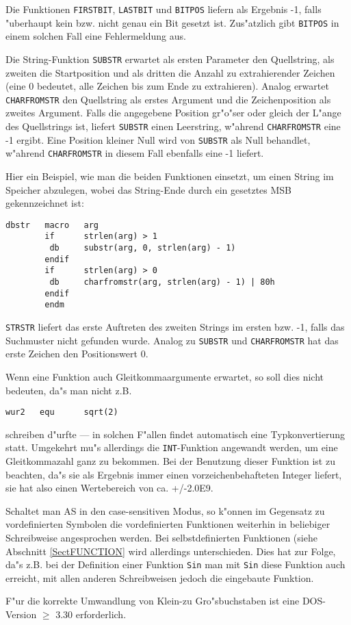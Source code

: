 \documentclass[12pt,a4paper,twoside]{report}
\newcommand{\tty}[1]{{\tt #1}}
\begin{document}
Die Funktionen \tty{FIRSTBIT}, \tty{LASTBIT} und \tty{BITPOS} liefern
als Ergebnis -1, falls "uberhaupt kein bzw. nicht genau ein Bit gesetzt
ist. Zus"atzlich gibt \tty{BITPOS} in einem solchen Fall eine
Fehlermeldung aus.
\par
Die String-Funktion \tty{SUBSTR} erwartet als ersten Parameter den
Quellstring, als zweiten die Startposition und als dritten die Anzahl zu
extrahierender Zeichen (eine 0 bedeutet, alle Zeichen bis zum Ende zu
extrahieren).  Analog erwartet \tty{CHARFROMSTR} den Quellstring als
erstes Argument und die Zeichenposition als zweites Argument.  Falls die
angegebene Position gr"o"ser oder gleich der L"ange des Quellstrings ist,
liefert \tty{SUBSTR} einen Leerstring, w"ahrend \tty{CHARFROMSTR} eine -1
ergibt.  Eine Position kleiner Null wird von \tty{SUBSTR} als Null
behandlet, w"ahrend \tty{CHARFROMSTR} in diesem Fall ebenfalls eine -1
liefert.

Hier ein Beispiel, wie man die beiden Funktionen einsetzt, um einen
String im Speicher abzulegen, wobei das String-Ende durch ein gesetztes
MSB gekennzeichnet ist:

\begin{verbatim}
dbstr   macro   arg
        if      strlen(arg) > 1
         db     substr(arg, 0, strlen(arg) - 1)
        endif
        if      strlen(arg) > 0
         db     charfromstr(arg, strlen(arg) - 1) | 80h
        endif
        endm
\end{verbatim}

\tty{STRSTR} liefert das erste Auftreten des zweiten Strings
im ersten bzw. -1, falls das Suchmuster nicht gefunden wurde.
Analog zu \tty{SUBSTR} und \tty{CHARFROMSTR} hat das erste
Zeichen den Positionswert 0.

Wenn eine Funktion auch Gleitkommaargumente erwartet, so soll
dies nicht bedeuten, da"s man nicht z.B.
\begin{verbatim}
wur2   equ      sqrt(2)
\end{verbatim}
schreiben d"urfte --- in solchen F"allen findet automatisch eine
Typkonvertierung statt.  Umgekehrt mu"s allerdings die \tty{INT}-Funktion
angewandt werden, um eine Gleitkommazahl ganz zu bekommen.  Bei der
Benutzung dieser Funktion ist zu beachten, da"s sie als Ergebnis
immer einen vorzeichenbehafteten Integer liefert, sie hat also
einen Wertebereich von ca. +/-2.0E9.
\par
Schaltet man AS in den case-sensitiven Modus, so k"onnen im
Gegensatz zu vordefinierten Symbolen die vordefinierten Funktionen
weiterhin in beliebiger Schreibweise angesprochen werden.  Bei
selbstdefinierten Funktionen (siehe Abschnitt \ref{SectFUNCTION}
wird allerdings unterschieden.  Dies  hat zur Folge, da"s z.B. bei
der Definition einer Funktion \tty{Sin} man mit \tty{Sin} diese
Funktion auch erreicht, mit allen anderen Schreibweisen jedoch die
eingebaute Funktion.
\par
F"ur die korrekte Umwandlung  von Klein-zu
Gro"sbuchstaben ist eine DOS-Version $\geq$ 3.30
erforderlich.
\end{document}
